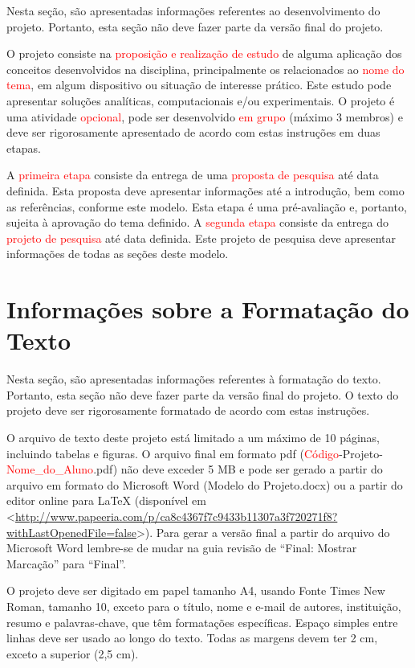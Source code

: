 \documentclass[%
  article,%
  10pt,%
  a4paper,%
  fleqn,%
  oneside,%
  sumario = tradicional,%
  chapter = TITLE,%
  section = TITLE,%
]{abntex2}
\begin{document}
Nesta seção, são apresentadas informações referentes ao desenvolvimento do projeto. Portanto, esta seção não deve fazer parte da versão final do projeto.

O projeto consiste na \textcolor{red}{proposição e realização de estudo} de alguma aplicação dos conceitos desenvolvidos na disciplina, principalmente os relacionados ao \textcolor{red}{nome do tema}, em algum dispositivo ou situação de interesse prático. Este estudo pode apresentar soluções analíticas, computacionais e/ou experimentais. O projeto é uma atividade \textcolor{red}{opcional}, pode ser desenvolvido \textcolor{red}{em grupo} (máximo 3 membros) e deve ser rigorosamente apresentado de acordo com estas instruções em duas etapas.

A \textcolor{red}{primeira etapa} consiste da entrega de uma \textcolor{red}{proposta de pesquisa} até data definida. Esta proposta deve apresentar informações até a introdução, bem como as referências, conforme este modelo. Esta etapa é uma pré-avaliação e, portanto, sujeita à aprovação do tema definido. A \textcolor{red}{segunda etapa} consiste da entrega do \textcolor{red}{projeto de pesquisa} até data definida. Este projeto de pesquisa deve apresentar informações de todas as seções deste modelo.

\section{Informações sobre a Formatação do Texto}\label{sec:infoform}

Nesta seção, são apresentadas informações referentes à formatação do texto. Portanto, esta seção não deve fazer parte da versão final do projeto. O texto do projeto deve ser rigorosamente formatado de acordo com estas instruções.

O arquivo de texto deste projeto está limitado a um máximo de 10 páginas, incluindo tabelas e figuras. O arquivo final em formato pdf (\textcolor{red}{Código}-Projeto-\textcolor{red}{Nome\_do\_Aluno}.pdf) não deve exceder 5 MB e pode ser gerado a partir do arquivo em formato do Microsoft Word (Modelo do Projeto.docx) ou a partir do editor online para LaTeX (disponível em <\url{http://www.papeeria.com/p/ca8c4367f7c9433b11307a3f720271f8?withLastOpenedFile=false}>). Para gerar a versão final a partir do arquivo do Microsoft Word lembre-se de mudar na guia revisão de ``Final: Mostrar Marcação'' para ``Final''.

O projeto deve ser digitado em papel tamanho A4, usando Fonte Times New Roman, tamanho 10, exceto para o título, nome e e-mail de autores, instituição, resumo e palavras-chave, que têm formatações específicas. Espaço simples entre linhas deve ser usado ao longo do texto. Todas as margens devem ter 2 cm, exceto a superior (2,5 cm).
\end{document}
